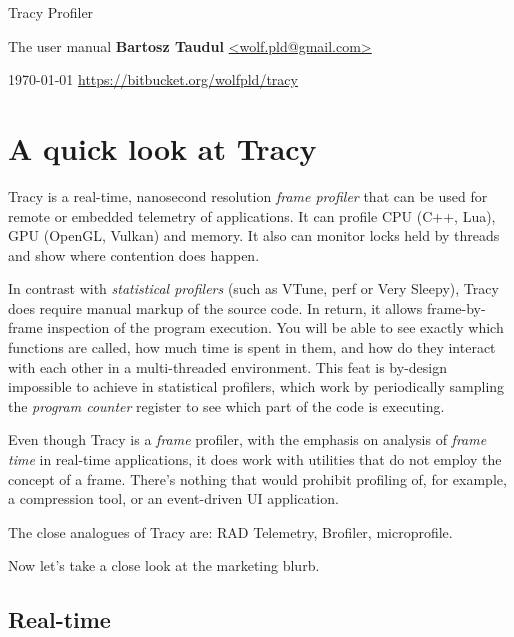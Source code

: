 \documentclass[hidelinks,titlepage,a4paper]{article}
\begin{document}
\begin{titlepage}
\centering
{\fontsize{120}{140}\selectfont Tracy Profiler}

\vspace{50pt} {\Huge{}\selectfont The user manual}
\vfill
\large\textbf{Bartosz Taudul} \href{mailto:wolf.pld@gmail.com}{<wolf.pld@gmail.com>}

\vspace{10pt}
\today
\vfill
\url{https://bitbucket.org/wolfpld/tracy}
\end{titlepage}

\tableofcontents

\newpage

\section{A quick look at Tracy}

Tracy is a real-time, nanosecond resolution \emph{frame profiler} that can be used for remote or embedded telemetry of applications. It can profile CPU (C++, Lua), GPU (OpenGL, Vulkan) and memory. It also can monitor locks held by threads and show where contention does happen.

In contrast with \emph{statistical profilers} (such as VTune, perf or Very Sleepy), Tracy does require manual markup of the source code. In return, it allows frame-by-frame inspection of the program execution. You will be able to see exactly which functions are called, how much time is spent in them, and how do they interact with each other in a multi-threaded environment. This feat is by-design impossible to achieve in statistical profilers, which work by periodically sampling the \emph{program counter} register to see which part of the code is executing.

Even though Tracy is a \emph{frame} profiler, with the emphasis on analysis of \emph{frame time} in real-time applications, it does work with utilities that do not employ the concept of a frame. There's nothing that would prohibit profiling of, for example, a compression tool, or an event-driven UI application.

The close analogues of Tracy are: RAD Telemetry, Brofiler, microprofile.

Now let's take a close look at the marketing blurb.

\subsection{Real-time}
\end{document}
